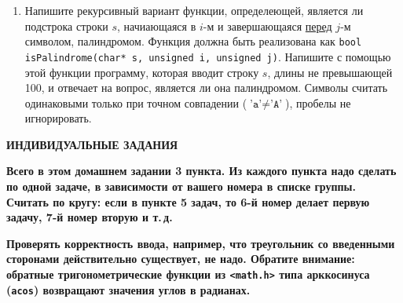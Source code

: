 \documentclass{article}
\begin{document}
\begin{enumerate}
\item
Напишите рекурсивный вариант функции, определеющей, является ли подстрока строки $s$, начиающаяся в $i$-м и завершающаяся \underline{перед} $j$-м символом, палиндромом. Функция должна быть реализована как \texttt{bool isPalindrome(char* s, unsigned i, unsigned j)}. Напишите с помощью этой функции программу, которая вводит строку $s$, длины не превышающей 100, и отвечает на вопрос, является ли она палиндромом. Символы считать одинаковыми только при точном совпадении ($\texttt{'a'}\ne\texttt{'A'}$), пробелы не игнорировать.

\end{enumerate}









\bigskip\sloppy

\noindent\centerline{\textbf{ИНДИВИДУАЛЬНЫЕ ЗАДАНИЯ}}

\medskip
\textbf{
Всего в этом домашнем задании 3 пункта. Из каждого пункта надо сделать по одной задаче, в зависимости от вашего номера в списке группы. Считать по кругу: если в пункте 5 задач, то 6-й номер делает первую задачу, 7-й номер вторую и т.\,д.}

\textbf{Проверять корректность ввода, например, что треугольник со введенными сторонами действительно существует, не надо. Обратите внимание: обратные тригонометрические функции из \texttt{<math.h>} типа арккосинуса (\texttt{acos}) возвращают значения углов в радианах. 
}
\end{document}
